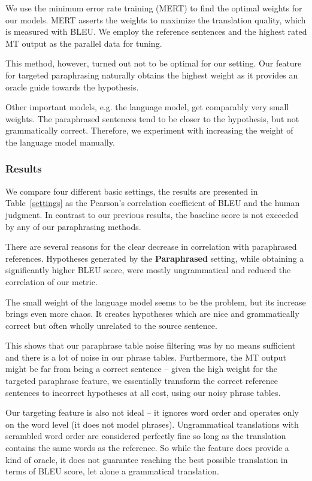 \documentclass[11pt]{article}
\def\Tref#1{Table~\ref{#1}}
\def\Fref#1{Figure~\ref{#1}}
\begin{document}
We use the minimum error rate training (MERT) \cite{mert} to find the optimal 
weights for our models. MERT asserts the weights to maximize the translation 
quality, which is measured with BLEU. We employ the reference sentences and the 
highest rated MT output as the parallel data for tuning. 

This method, however, turned out not to be optimal for our setting. Our feature 
for targeted paraphrasing naturally obtains the highest weight as it provides 
an oracle guide towards the hypothesis.

Other important models, e.g. the language model, get comparably very small 
weights. The paraphrased sentences tend to be closer to the hypothesis, but not 
grammatically correct. Therefore, we experiment with increasing the weight of 
the language model manually. 

\subsubsection{Results}
We compare four different basic settings, the results are presented in 
\Tref{settings} as the Pearson’s correlation coefficient of BLEU and the human 
judgment. In contrast to  our previous results, the baseline score is not 
exceeded by any of our paraphrasing methods.

There are several reasons for the clear decrease in correlation with 
paraphrased references. Hypotheses generated by the \textbf{Paraphrased} 
setting, while obtaining a significantly higher BLEU score, were mostly 
ungrammatical and reduced the correlation of our metric.

The small weight of the language model seems to be the problem, but its 
increase brings even more chaos. It creates hypotheses which are nice and 
grammatically correct but often wholly unrelated to the source sentence.

This shows that our paraphrase table noise filtering was by no means sufficient 
and there is a lot of noise in our phrase tables. Furthermore, the MT output 
might be far from being a correct sentence -- given the high weight for the 
targeted paraphrase feature, we essentially transform the correct reference 
sentences to incorrect hypotheses at all cost, using our noisy phrase tables.

Our targeting feature is also not ideal -- it ignores word order and operates
only on the word level (it does not model phrases). Ungrammatical translations
with scrambled word order are considered perfectly fine so long as the
translation contains the same words as the reference. So while the feature does
provide a kind of oracle, it does not guarantee reaching the best possible
translation in terms of BLEU score, let alone a grammatical translation.
\end{document}
